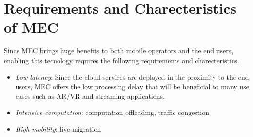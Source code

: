 \section{Requirements and Charecteristics of MEC}  \label{requirements}

Since MEC brings huge benefits to both mobile operators and the end users, enabling this tecnology requires the following requirements and charecteristics.

\begin{itemize}

\item \textit{\textit{Low latency}}: Since the cloud services are deployed in the proximity to the end users, MEC offers the low processing delay that will be beneficial to many use cases such as AR/VR and streaming applications.

\item \textit{\textit{Intensive computation}}: computation offloading, traffic congestion

\item \textit{\textit{High mobility}}: live migration

\end{itemize}
